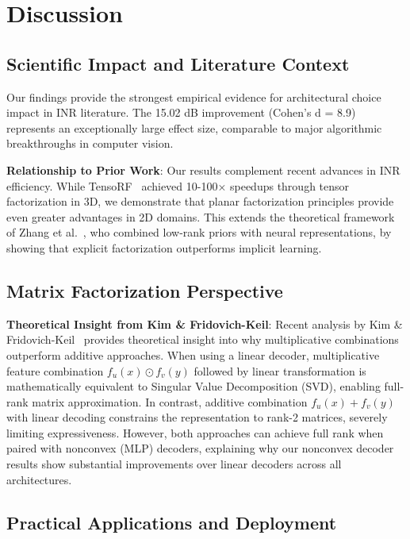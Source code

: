 \documentclass{article}
\begin{document}
\section{Discussion}

\subsection{Scientific Impact and Literature Context}

Our findings provide the strongest empirical evidence for architectural choice impact in INR literature. The 15.02 dB improvement (Cohen's d = 8.9) represents an exceptionally large effect size, comparable to major algorithmic breakthroughs in computer vision.

\textbf{Relationship to Prior Work}: Our results complement recent advances in INR efficiency. While TensoRF~\cite{chen2022tensorf} achieved 10-100× speedups through tensor factorization in 3D, we demonstrate that planar factorization principles provide even greater advantages in 2D domains. This extends the theoretical framework of Zhang et al.~\cite{zhang2025lorein}, who combined low-rank priors with neural representations, by showing that explicit factorization outperforms implicit learning.

\subsection{Matrix Factorization Perspective}

\textbf{Theoretical Insight from Kim \& Fridovich-Keil}: Recent analysis by Kim \& Fridovich-Keil~\cite{kim2025grids} provides theoretical insight into why multiplicative combinations outperform additive approaches. When using a linear decoder, multiplicative feature combination $f_u(x) \odot f_v(y)$ followed by linear transformation is mathematically equivalent to Singular Value Decomposition (SVD), enabling full-rank matrix approximation. In contrast, additive combination $f_u(x) + f_v(y)$ with linear decoding constrains the representation to rank-2 matrices, severely limiting expressiveness. However, both approaches can achieve full rank when paired with nonconvex (MLP) decoders, explaining why our nonconvex decoder results show substantial improvements over linear decoders across all architectures.

\subsection{Practical Applications and Deployment}
\end{document}
